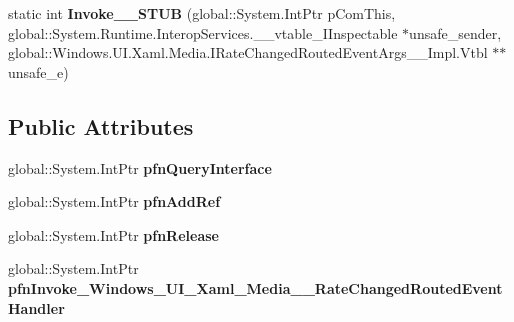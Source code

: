 \begin{DoxyCompactItemize}
\item 
\mbox{\label{struct_windows_1_1_u_i_1_1_xaml_1_1_media_1_1_rate_changed_routed_event_handler_____impl_1_1_vtbl_afcb8aa9c9ec10fdb63e0e499996bd6f5}} 
static int {\bfseries Invoke\+\_\+\+\_\+\+S\+T\+UB} (global\+::\+System.\+Int\+Ptr p\+Com\+This, global\+::\+System.\+Runtime.\+Interop\+Services.\+\_\+\+\_\+vtable\+\_\+\+I\+Inspectable $\ast$unsafe\+\_\+sender, global\+::\+Windows.\+U\+I.\+Xaml.\+Media.\+I\+Rate\+Changed\+Routed\+Event\+Args\+\_\+\+\_\+\+Impl.\+Vtbl $\ast$$\ast$unsafe\+\_\+e)
\end{DoxyCompactItemize}
\subsection*{Public Attributes}
\begin{DoxyCompactItemize}
\item 
\mbox{\label{struct_windows_1_1_u_i_1_1_xaml_1_1_media_1_1_rate_changed_routed_event_handler_____impl_1_1_vtbl_ae7b131448dfadc1226c5d801dfa2293e}} 
global\+::\+System.\+Int\+Ptr {\bfseries pfn\+Query\+Interface}
\item 
\mbox{\label{struct_windows_1_1_u_i_1_1_xaml_1_1_media_1_1_rate_changed_routed_event_handler_____impl_1_1_vtbl_a61b9b0dcec9dbce3a17d39f7a7d37d11}} 
global\+::\+System.\+Int\+Ptr {\bfseries pfn\+Add\+Ref}
\item 
\mbox{\label{struct_windows_1_1_u_i_1_1_xaml_1_1_media_1_1_rate_changed_routed_event_handler_____impl_1_1_vtbl_a7c7dea409b7407c1b70eb5eeb18a2b22}} 
global\+::\+System.\+Int\+Ptr {\bfseries pfn\+Release}
\item 
\mbox{\label{struct_windows_1_1_u_i_1_1_xaml_1_1_media_1_1_rate_changed_routed_event_handler_____impl_1_1_vtbl_aa7bcc52f04474d0f64a84e662693ce52}} 
global\+::\+System.\+Int\+Ptr {\bfseries pfn\+Invoke\+\_\+\+Windows\+\_\+\+U\+I\+\_\+\+Xaml\+\_\+\+Media\+\_\+\+\_\+\+Rate\+Changed\+Routed\+Event\+Handler}
\end{DoxyCompactItemize}
